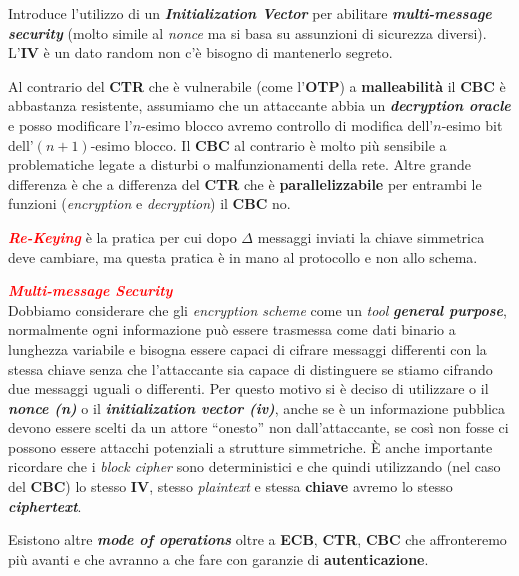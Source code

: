 \begin{flushleft}
    \bigskip

    Introduce l'utilizzo di un \textbf{\textit{Initialization Vector}} per abilitare \textbf{\textit{multi-message security}} (molto simile al \textit{nonce} ma si basa su assunzioni di sicurezza diversi). L'\textbf{IV} è un dato random non c'è bisogno di mantenerlo segreto.

    \bigskip

    Al contrario del \textbf{CTR} che è vulnerabile (come l'\textbf{OTP}) a \textbf{malleabilità} il \textbf{CBC} è abbastanza resistente, assumiamo che un attaccante abbia un \textbf{\textit{decryption oracle}} e posso modificare l'$n$-esimo blocco avremo controllo di modifica dell'$n$-esimo bit dell'$(n + 1)$-esimo blocco. Il \textbf{CBC} al contrario è molto più sensibile a problematiche legate a disturbi o malfunzionamenti della rete. Altre grande differenza è che a differenza del \textbf{CTR} che è \textbf{parallelizzabile} per entrambi le funzioni (\textit{encryption} e \textit{decryption}) il \textbf{CBC} no.

    \bigskip

    \textcolor{red}{\textbf{\textit{Re-Keying}}} è la pratica per cui dopo $\Delta$ messaggi inviati la chiave simmetrica deve cambiare, ma questa pratica è in mano al protocollo e non allo schema.

\end{flushleft}

\begin{flushleft}
    \textcolor{red}{\textbf{\textit{Multi-message Security}}} \\
    Dobbiamo considerare che gli \textit{encryption scheme} come un \textit{tool} \textbf{\textit{general purpose}}, normalmente ogni informazione può essere trasmessa come dati binario a lunghezza variabile e bisogna essere capaci di cifrare messaggi differenti con la stessa chiave senza che l'attaccante sia capace di distinguere se stiamo cifrando due messaggi uguali o differenti. Per questo motivo si è deciso di utilizzare o il \textbf{\textit{nonce (n)}} o il \textbf{\textit{initialization vector (iv)}}, anche se è un informazione pubblica devono essere scelti da un attore ``onesto'' non dall'attaccante, se così non fosse ci possono essere attacchi potenziali a strutture simmetriche. È anche importante ricordare che i \textit{block cipher} sono deterministici e che quindi utilizzando (nel caso del \textbf{CBC}) lo stesso \textbf{IV}, stesso \textit{plaintext} e stessa \textbf{chiave} avremo lo stesso \textbf{\textit{ciphertext}}.

    \bigskip

    Esistono altre \textbf{\textit{mode of operations}} oltre a \textbf{ECB}, \textbf{CTR}, \textbf{CBC} che affronteremo più avanti e che avranno a che fare con garanzie di \textbf{autenticazione}.
\end{flushleft}

